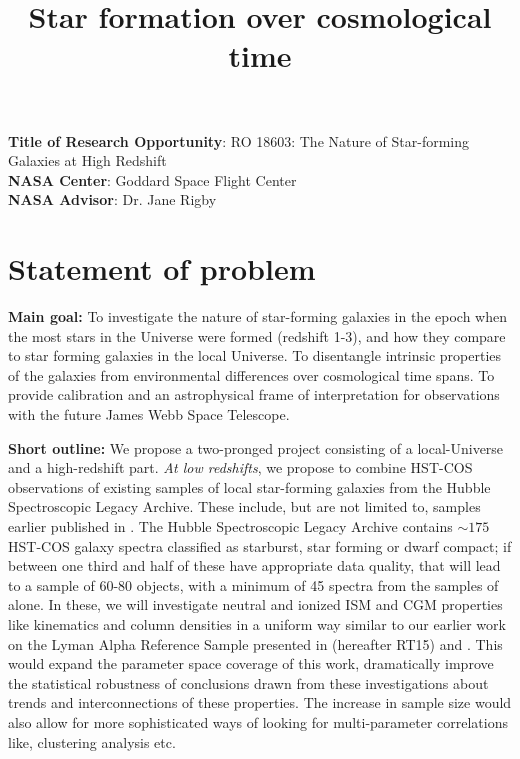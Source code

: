 \documentclass[12pt]{amsart}
\title{Star formation over cosmological time}
\begin{document}
\maketitle

\doublespacing

\noindent
\textbf{Title of Research Opportunity}: RO 18603: The Nature of Star-forming Galaxies at High Redshift\\
\smallskip
\noindent
\textbf{NASA Center}: Goddard Space Flight Center\\
\smallskip
\noindent
\textbf{NASA Advisor}: Dr. Jane Rigby\\
\smallskip


\section{Statement of problem}

\textbf{Main goal:} To investigate the nature of star-forming galaxies in the
epoch when the most stars in the Universe were formed (redshift 1-3), and how
they compare to star forming galaxies in the local Universe. To
disentangle intrinsic properties of the galaxies from environmental differences
over cosmological time spans. To provide calibration and an astrophysical frame
of interpretation for observations with the future James Webb Space Telescope.

\textbf{Short outline:} We propose a two-pronged project consisting of a
local-Universe and a high-redshift part.  \emph{At low redshifts}, we propose to
combine HST-COS observations of existing samples of local star-forming galaxies
from the Hubble Spectroscopic Legacy Archive. These include, but are not limited
to, samples earlier published in
\cite{Heckman2011,Heckman2015,Alexandroff2015,Henry2015,Wofford2013}. The Hubble
Spectroscopic Legacy Archive contains $\sim 175$ HST-COS galaxy spectra
classified as starburst, star forming or dwarf compact; if between one third and
half of these have appropriate data quality, that will lead to a sample of 60-80
objects, with a minimum of 45 spectra from the samples of
\cite{Heckman2011,Alexandroff2015,Wofford2013,Henry2015,JaskotOey} alone. In
these, we will investigate neutral and ionized ISM and CGM properties like
kinematics and column densities in a uniform way similar to our earlier work on
the Lyman Alpha Reference Sample \citep[LARS, ][]{LARSI,LARSII} presented in
\cite{RiveraThorsen2015} (hereafter RT15) and \cite{RiveraThorsen2017}. This
would expand the parameter space coverage of this work,  dramatically improve
the statistical robustness of conclusions drawn from these investigations about
trends and interconnections of these properties. The increase in sample size
would also allow for more sophisticated ways of looking for multi-parameter
correlations like, clustering analysis etc.
\end{document}
